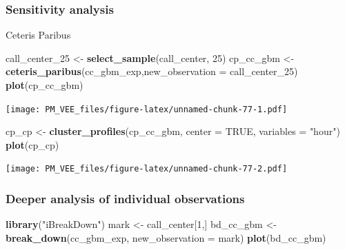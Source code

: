 \documentclass[12pt,]{krantz}
\newenvironment{Shaded}{\begin{snugshade}}{\end{snugshade}}
\newcommand{\DataTypeTok}[1]{\textcolor[rgb]{0.13,0.29,0.53}{#1}}
\newcommand{\DecValTok}[1]{\textcolor[rgb]{0.00,0.00,0.81}{#1}}
\newcommand{\KeywordTok}[1]{\textcolor[rgb]{0.13,0.29,0.53}{\textbf{#1}}}
\newcommand{\NormalTok}[1]{#1}
\newcommand{\OtherTok}[1]{\textcolor[rgb]{0.56,0.35,0.01}{#1}}
\newcommand{\StringTok}[1]{\textcolor[rgb]{0.31,0.60,0.02}{#1}}
\begin{document}
\hypertarget{sensitivity-analysis}{%
\subsubsection{Sensitivity analysis}\label{sensitivity-analysis}}

Ceteris Paribus

\begin{Shaded}
\begin{Highlighting}[]
\NormalTok{call_center_}\DecValTok{25}\NormalTok{ <-}\StringTok{ }\KeywordTok{select_sample}\NormalTok{(call_center, }\DecValTok{25}\NormalTok{)}
\NormalTok{cp_cc_gbm <-}\StringTok{ }\KeywordTok{ceteris_paribus}\NormalTok{(cc_gbm_exp,}\DataTypeTok{new_observation =}\NormalTok{ call_center_}\DecValTok{25}\NormalTok{)}
\KeywordTok{plot}\NormalTok{(cp_cc_gbm)}
\end{Highlighting}
\end{Shaded}

\texttt{[image: PM\_VEE\_files/figure-latex/unnamed-chunk-77-1.pdf]}

\begin{Shaded}
\begin{Highlighting}[]
\NormalTok{cp_cp <-}\StringTok{ }\KeywordTok{cluster_profiles}\NormalTok{(cp_cc_gbm, }\DataTypeTok{center =} \OtherTok{TRUE}\NormalTok{, }\DataTypeTok{variables =} \StringTok{"hour"}\NormalTok{)}
\KeywordTok{plot}\NormalTok{(cp_cp)}
\end{Highlighting}
\end{Shaded}

\texttt{[image: PM\_VEE\_files/figure-latex/unnamed-chunk-77-2.pdf]}

\hypertarget{deeper-analysis-of-individual-observations}{%
\subsubsection{Deeper analysis of individual observations}\label{deeper-analysis-of-individual-observations}}

\begin{Shaded}
\begin{Highlighting}[]
\KeywordTok{library}\NormalTok{(}\StringTok{"iBreakDown"}\NormalTok{)}
\NormalTok{mark <-}\StringTok{ }\NormalTok{call_center[}\DecValTok{1}\NormalTok{,]}
\NormalTok{bd_cc_gbm <-}\StringTok{ }\KeywordTok{break_down}\NormalTok{(cc_gbm_exp, }\DataTypeTok{new_observation =}\NormalTok{ mark)}
\KeywordTok{plot}\NormalTok{(bd_cc_gbm)}
\end{Highlighting}
\end{Shaded}
\end{document}
